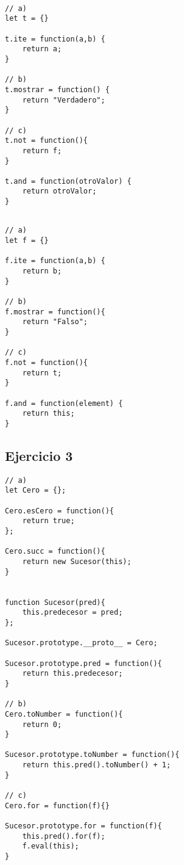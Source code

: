 \documentclass[10pt,a4paper]{article}
\begin{document}
\begin{multicols}{2}
\begin{centrado2}
\begin{verbatim}

// a)
let t = {}

t.ite = function(a,b) {
    return a;
}

// b)
t.mostrar = function() {
    return "Verdadero";
}

// c)
t.not = function(){
    return f;
}

t.and = function(otroValor) {
    return otroValor;
}

\end{verbatim}
\end{centrado2}
\begin{centrado2}
\begin{verbatim}

// a)
let f = {}

f.ite = function(a,b) {
    return b;
}

// b)
f.mostrar = function(){
    return "Falso";
}

// c)
f.not = function(){
    return t;
}

f.and = function(element) {
    return this;
}

\end{verbatim}
\end{centrado2}
\end{multicols}

\subsection{Ejercicio 3}
\begin{centrado}
\begin{verbatim}
// a)
let Cero = {};

Cero.esCero = function(){
    return true;
};

Cero.succ = function(){
    return new Sucesor(this);
}


function Sucesor(pred){
    this.predecesor = pred;
};

Sucesor.prototype.__proto__ = Cero;   

Sucesor.prototype.pred = function(){
    return this.predecesor;
}

// b)
Cero.toNumber = function(){
    return 0;
}

Sucesor.prototype.toNumber = function(){
    return this.pred().toNumber() + 1;
}

// c)
Cero.for = function(f){}

Sucesor.prototype.for = function(f){
    this.pred().for(f);
    f.eval(this);
}
\end{verbatim}
\end{centrado}
\end{document}
